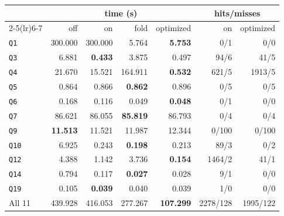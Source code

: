 \begin{tabular}{lrrrrrr}
\toprule
& \multicolumn{4}{c}{time (s)} & \multicolumn{2}{c}{hits/misses} \\
\cmidrule(lr){2-5}\cmidrule(lr){6-7}
& off & on & fold & optimized & on & optimized \\
\midrule
\texttt{Q1} & 300.000 & 300.000 & 5.764 & \textbf{5.753} & 0/1 & 0/0 \\
\texttt{Q3} & 6.881 & \textbf{0.433} & 3.875 & 0.497 & 94/6 & 41/5 \\
\texttt{Q4} & 21.670 & 15.521 & 164.911 & \textbf{0.532} & 621/5 & 1913/5 \\
\texttt{Q5} & 0.864 & 0.866 & \textbf{0.862} & 0.896 & 0/5 & 0/5 \\
\texttt{Q6} & 0.168 & 0.116 & 0.049 & \textbf{0.048} & 0/1 & 0/0 \\
\texttt{Q7} & 86.621 & 86.055 & \textbf{85.819} & 86.793 & 0/4 & 0/4 \\
\texttt{Q9} & \textbf{11.513} & 11.521 & 11.987 & 12.344 & 0/100 & 0/100 \\
\texttt{Q10} & 6.925 & 0.243 & \textbf{0.198} & 0.213 & 89/3 & 0/2 \\
\texttt{Q12} & 4.388 & 1.142 & 3.736 & \textbf{0.154} & 1464/2 & 41/1 \\
\texttt{Q14} & 0.794 & 0.117 & \textbf{0.027} & 0.028 & 9/1 & 0/0 \\
\texttt{Q19} & 0.105 & \textbf{0.039} & 0.040 & 0.039 & 1/0 & 0/0 \\
\midrule
All 11 & 439.928 & 416.053 & 277.267 & \textbf{107.299} & 2278/128 & 1995/122 \\
\bottomrule
\end{tabular}
\par\vspace{2mm}{\small off: cache and folding off; on: cache only; fold: folding only; optimized: cache and folding. Bold: the smallest time of the row.\par}
